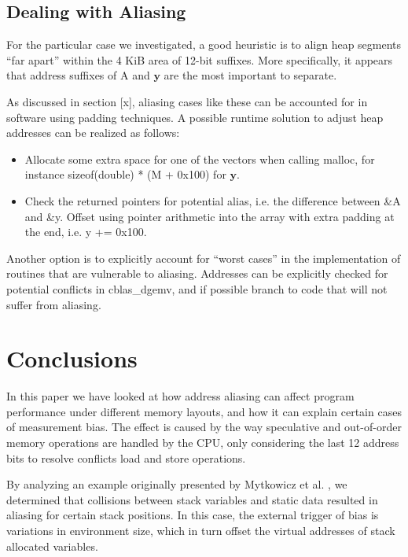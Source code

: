 \documentclass[a4paper,10pt,twocolumn,twoside]{article}
\begin{document}
{\subsection{Dealing with Aliasing}
For the particular case we investigated, a good heuristic is to align heap segments “far apart” within the 4 KiB area of 12-bit suffixes.
More specifically, it appears that address suffixes of A and $\boldsymbol{y}$ are the most important to separate.

As discussed in section [x], aliasing cases like these can be accounted for in software using padding techniques.
A possible runtime solution to adjust heap addresses can be realized as follows:

\begin{itemize}
  \item Allocate some extra space for one of the vectors when calling malloc, for instance sizeof(double) * (M + 0x100) for $\boldsymbol{y}$.

  \item Check the returned pointers for potential alias, i.e. the difference between \&A and \&y. Offset using pointer arithmetic into the array with extra padding at the end, i.e. y += 0x100. 
\end{itemize}

Another option is to explicitly account for “worst cases” in the implementation of routines that are vulnerable to aliasing.
Addresses can be explicitly checked for potential conflicts in cblas\_dgemv, and if possible branch to code that will not suffer from aliasing. 

\fi


\section{Conclusions}
In this paper we have looked at how address aliasing can affect program performance under different memory layouts, and how it can explain certain cases of measurement bias. 
The effect is caused by the way speculative and out-of-order memory operations are handled by the CPU, only considering the last 12 address bits to resolve conflicts load and store operations.

By analyzing an example originally presented by Mytkowicz et al. \cite{Mytkowicz:2009:WrongData}, we determined that collisions between stack variables and static data resulted in aliasing for certain stack positions.
In this case, the external trigger of bias is variations in environment size, which in turn offset the virtual addresses of stack allocated variables.


}
\end{document}
